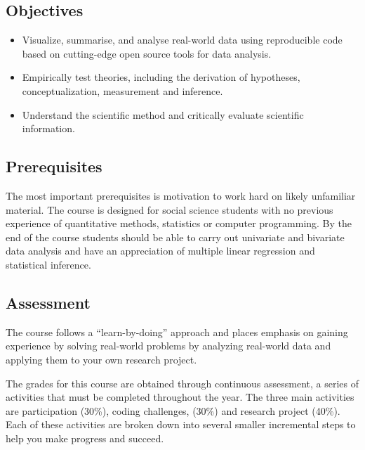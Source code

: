 \documentclass{article}
\begin{document}
\subsection*{Objectives}


\begin{itemize}
    \item Visualize, summarise, and analyse real-world data using reproducible code based on cutting-edge open source tools for data analysis.
    \item Empirically test theories, including the derivation of hypotheses, conceptualization, measurement and inference.
    \item Understand the scientific method and critically evaluate scientific information.
\end{itemize}

\subsection*{Prerequisites}
The most important prerequisites is motivation to work hard on likely unfamiliar material. The course is designed for social science students with no previous experience of quantitative methods, statistics or computer programming. By the end of the course students should be able to carry out univariate and bivariate data analysis and have an appreciation of multiple linear regression and statistical inference.

\subsection*{Assessment}

The course follows a “learn-by-doing” approach and places emphasis on gaining experience by solving real-world problems by analyzing real-world data and applying them to your own research project.

The grades for this course are obtained through continuous assessment, a series of activities that must be completed throughout the year. The three main activities are participation (30\%), coding challenges, (30\%) and research project (40\%). Each of these activities are broken down into several smaller incremental steps to help you make progress and succeed.



\nocite{king1994designing, imai2018quantitative,gelman2020regression}
\end{document}
